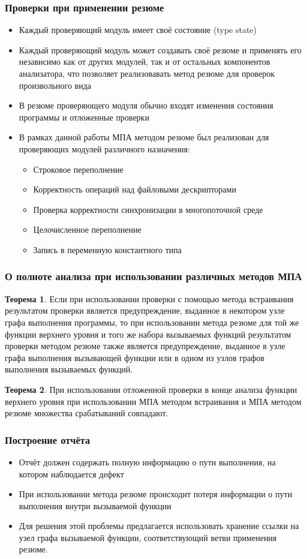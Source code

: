 \documentclass[14pt]{beamer}
\begin{document}
\begin{frame}[allowframebreaks]
\frametitle{Проверки при применении резюме}
\begin{itemize}
  \item Каждый проверяющий модуль имеет своё состояние (type state)
  \item Каждый проверяющий модуль может создавать своё резюме и применять его независимо как от других модулей, так и от остальных компонентов анализатора, что позволяет реализовавать метод резюме для проверок произвольного вида
  \item В резюме проверяющего модуля обычно входят изменения состояния программы и отложенные проверки
  \item В рамках данной работы МПА методом резюме был реализован для проверяющих модулей различного назначения:
    \begin{itemize}
    \item Строковое переполнение
    \item Корректность операций над файловыми дескрипторами
    \item Проверка корректности синхронизации в многопоточной среде
    \item Целочисленное переполнение
    \item Запись в переменную константного типа
  \end{itemize}
\end{itemize}
\end{frame}

\begin{frame}[allowframebreaks]
\frametitle{О полноте анализа при использовании различных методов МПА}
\textbf{Теорема 1}. Если при использовании проверки с помощью метода встраивания результатом проверки является предупреждение, выданное в некотором узле графа выполнения программы, то при использовании метода резюме для той же функции верхнего уровня и того же набора вызываемых функций результатом проверки методом резюме также является предупреждение, выданное в узле графа выполнения вызывающей функции или в одном из узлов графов выполнения вызываемых функций.

\textbf{Теорема 2}. При использовании отложенной проверки в конце анализа функции верхнего уровня при использовании МПА методом встраивания и МПА методом резюме множества срабатываний совпадают.
\end{frame}

\begin{frame}
\frametitle{Построение отчёта}
\begin{itemize}
  \item Отчёт должен содержать полную информацию о пути выполнения, на котором наблюдается дефект
  \item При использовании метода резюме происходит потеря информации о пути выполнения внутри вызываемой функции
  \item Для решения этой проблемы предлагается использовать хранение ссылки на узел графа вызываемой функции, соответствующий ветви применения резюме.
\end{itemize}
\end{frame}
\end{document}
